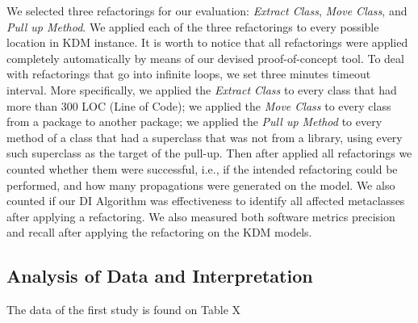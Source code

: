 We selected three refactorings for our evaluation: \textit{Extract Class}, \textit{Move Class}, and \textit{Pull up Method}. We applied each of the three refactorings to every possible location in KDM instance. It is worth to notice that all refactorings were applied completely automatically by means of our devised proof-of-concept tool. To deal with refactorings that go into infinite loops, we set three minutes timeout interval. More specifically, we applied the \textit{Extract Class} to every class that had more than 300 LOC (Line of Code); we applied the \textit{Move Class} to every class from a package to another package; we applied the \textit{Pull up Method} to every method of a class that had a superclass that was not from a library, using every such superclass as the target of the pull-up. Then after applied all refactorings we counted whether them were successful, i.e., if the intended refactoring could be performed, and how many propagations were generated on the model. We also counted if our DI Algorithm was effectiveness to identify all affected metaclasses after applying a refactoring. We also measured both software metrics precision and recall after applying the refactoring on the KDM models.



\subsection{Analysis of Data and Interpretation}\label{analysis_of_data}



The data of the first study is found on Table X